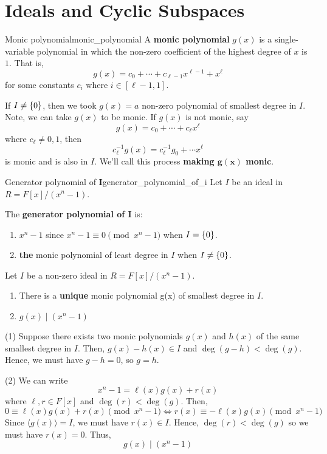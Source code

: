 \section{Ideals and Cyclic Subspaces}

\begin{Definition}{Monic polynomial}{monic_polynomial}
    A \textbf{monic polynomial} $ g(x) $ is a single-variable
    polynomial in which the non-zero coefficient of the highest degree of $ x $
    is $ 1 $. That is,
    \[ g(x)=c_0+\cdots+c_{\ell -1}x^{\ell -1}+ x^\ell \]
    for some constants $ c_i $ where $ i\in[\ell-1,1] $.
\end{Definition}

If $ I\neq \{0\} $, then we took $ g(x)=a $ non-zero
polynomial of smallest degree in $ I $. Note, we can
take $ g(x) $ to be monic. If $ g(x) $ is not monic, say
\[ g(x)=c_0+\cdots+c_\ell x^{\ell} \]
where $ c_\ell \neq 0, 1 $, then
\[ c_{\ell}^{-1}g(x)=c_\ell^{-1} g_0+\cdots x^\ell \]
is monic and is also in $ I $. We'll call this process
\textbf{making $ \symbf{g(x)} $ monic}.

\begin{Definition}{Generator polynomial of $ \symbf{I} $}{generator_polynomial_of_i}
    Let $ I $ be an ideal in $ R=F[x]/(x^n-1) $.

    The \textbf{generator polynomial of $ \symbf{I} $} is:
    \begin{enumerate}[label=(\arabic*)]
        \item $ x^n-1 $ since $ x^n-1\equiv 0 \pmod{x^n-1} $ when $ I=\{0\} $.
        \item \textbf{the}
              monic polynomial of least degree in $ I $ when $ I \neq \{0\} $.
    \end{enumerate}
\end{Definition}

\begin{Theorem}{}{}
    Let $ I $ be a non-zero ideal in $ R=F[x]/(x^n-1) $.
    \begin{enumerate}[label=(\arabic*)]
        \item There is a \textbf{unique} monic polynomial
              g(x) of smallest degree in $ I $.
        \item $ g(x)\mid (x^n-1) $
    \end{enumerate}
\end{Theorem}

\begin{Proof}{}{}
(1) Suppose
there exists two monic polynomials $ g(x) $ and $ h(x) $
of the same smallest degree in $ I $.
Then, $ g(x)-h(x)\in I $ and $ \deg(g-h)<\deg (g) $. Hence, we must
have $ g-h=0 $, so $ g=h $.

(2) We can write
\[ x^n-1=\ell(x)g(x)+r(x) \]
where $ \ell,r\in F[x] $ and $ \deg(r)<\deg(g) $. Then,
\[ 0\equiv \ell (x)g(x)+r(x)\pmod{x^n-1}\iff r(x)\equiv -\ell(x)g(x)\pmod{x^n-1} \]
Since $ \langle g(x)\rangle = I $, we must have $ r(x)\in I $.
Hence, $ \deg(r)<\deg(g) $ so we must have $ r(x)=0 $. Thus,
\[ g(x)\mid (x^n-1) \]
\end{Proof}

